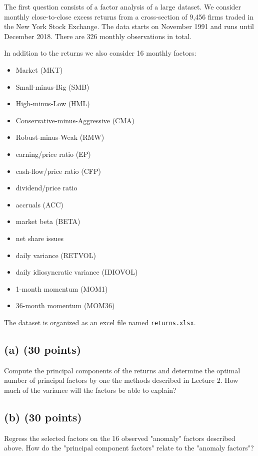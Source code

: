 The first question consists of a factor analysis of a large dataset. We consider monthly close-to-close excess returns from a cross-section of 9,456 firms traded in the New York Stock Exchange.
The data starts on November 1991 and runs until December 2018. There are 326 monthly
observations in total. 

In addition to the returns we also consider 16 monthly factors:
 
\begin{itemize}
	\item Market (MKT)
	\item Small-minus-Big (SMB)
	\item High-minus-Low (HML)
	\item Conservative-minus-Aggressive (CMA)
	\item Robust-minus-Weak (RMW)
	\item earning/price ratio (EP)
	\item cash-flow/price ratio (CFP)
	\item dividend/price ratio
	\item accruals (ACC)
	\item market beta (BETA)
	\item net share issues 
	\item daily variance (RETVOL)
	\item daily idiosyncratic variance (IDIOVOL)
	\item 1-month momentum (MOM1)
	\item 36-month momentum (MOM36)
\end{itemize}

The dataset is organized as an excel file named \texttt{returns.xlsx}.


\subsection{(a) (30 points)}
Compute the principal components of the returns and determine the optimal number of principal factors by one the methods described in Lecture 2. How much of the variance will the factors be able to explain?




\subsection{(b) (30 points)}
Regress the selected factors on the 16 observed "anomaly" factors described above. How do the "principal component factors" relate to the "anomaly factors"?




